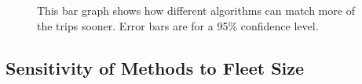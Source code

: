 \documentclass[letterpaper]{article}
\begin{document}
\begin{figure}




\label{averageWaitTimes}
\caption{This bar graph shows how different algorithms can match more of the trips sooner. Error bars are for a 95$\%$ confidence level.}
\end{figure}

\subsection{Sensitivity of Methods to Fleet Size}
\end{document}
